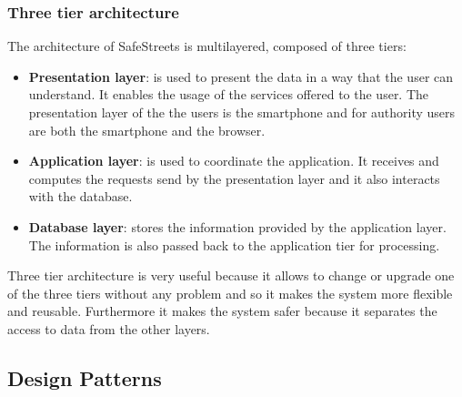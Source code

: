             \subsubsection{Three tier architecture}
            The architecture of SafeStreets is multilayered, composed of three tiers:
            \begin{itemize}
                \item \textbf{Presentation layer}: is used to present the data in a way
                that the user can understand. It enables the usage of the services
                offered to the user. The presentation layer of the the users is the
                smartphone and for authority users are both the smartphone and the
                browser.
                \item \textbf{Application layer}: is used to coordinate the application.
                It receives and computes the requests send by the presentation layer and
                it also interacts with the database.
                \item \textbf{Database layer}: stores the information provided by the
                application layer. The information is also passed back to the
                application tier for processing.
            \end{itemize}    
            Three tier architecture is very useful because it allows to change or
            upgrade one of the three tiers without any problem and so it makes the
            system more flexible and reusable. Furthermore it makes the system safer
            because it separates the access to data from the other layers.
                
  
        \subsection{Design Patterns}
